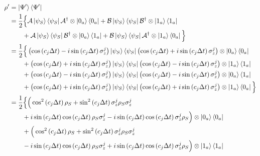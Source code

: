 \documentclass[a4paper,12pt]{article}
\begin{document}
	\begin{align*}
		\rho' &= \ket{\Psi'}\bra{\Psi'} \\ 
		& = \frac{1}{2} \Big\{ \mathcal{A} \ket{\psi_S}\bra{\psi_S} \mathcal{A^{\dagger}} \otimes \ket{0_a}\bra{0_a} + \mathcal{B} \ket{\psi_S}\bra{\psi_S} \mathcal{B^{\dagger}} \otimes \ket{1_a}\bra{1_a} \\
		& \qquad + \mathcal{A} \ket{\psi_S}\bra{\psi_S} \mathcal{B^{\dagger}} \otimes \ket{0_a}\bra{1_a} +  \mathcal{B} \ket{\psi_S}\bra{\psi_S} \mathcal{A^{\dagger}} \otimes \ket{1_a}\bra{0_a} \Big\} \\
		& = \frac{1}{2} \Big\{ \left(\cos{\left( c_j \Delta t \right)} - i \sin{\left( c_j \Delta t \right) \sigma_{z}^{j}}\right)  \ket{\psi_S}\bra{\psi_S} \left( \cos{\left( c_j \Delta t \right)} + i \sin{\left( c_j \Delta t \right) \sigma_{z}^{j}}\right) \otimes \ket{0_a}\bra{0_a} \\
		& \qquad + \left(\cos{\left( c_j \Delta t \right)} + i \sin{\left( c_j \Delta t \right) \sigma_{z}^{j}}\right)  \ket{\psi_S}\bra{\psi_S} \left( \cos{\left( c_j \Delta t \right)} - i \sin{\left( c_j \Delta t \right) \sigma_{z}^{j}}\right) \otimes \ket{1_a}\bra{1_a} \\
		& \qquad + \left(\cos{\left( c_j \Delta t \right)} - i \sin{\left( c_j \Delta t \right) \sigma_{z}^{j}}\right)  \ket{\psi_S}\bra{\psi_S} \left( \cos{\left( c_j \Delta t \right)} - i \sin{\left( c_j \Delta t \right) \sigma_{z}^{j}}\right) \otimes \ket{0_a}\bra{1_a} \\
		& \qquad + \left(\cos{\left( c_j \Delta t \right)} + i \sin{\left( c_j \Delta t \right) \sigma_{z}^{j}}\right)  \ket{\psi_S}\bra{\psi_S} \left( \cos{\left( c_j \Delta t \right)} + i \sin{\left( c_j \Delta t \right) \sigma_{z}^{j}}\right) \otimes \ket{1_a}\bra{0_a} \Big\} \\
		& = \frac{1}{2} \Big\{ \Big( \cos^{2}{\left( c_j \Delta t \right)} \, \rho_S + \sin^{2}{\left( c_j \Delta t \right)} \, \sigma_{z}^{j}\rho_S\sigma_{z}^{j} \\
		& \qquad +i \sin{\left( c_j \Delta t \right)}\cos{\left( c_j \Delta t \right)} \, \rho_S \sigma_{z}^{j} - i \sin{\left( c_j \Delta t \right)}\cos{\left( c_j \Delta t \right)} \, \sigma_{z}^{j} \rho_S \Big) \otimes \ket{0_a}\bra{0_a} \\
		& \qquad  + \Big( \cos^{2}{\left( c_j \Delta t \right)} \, \rho_S + \sin^{2}{\left( c_j \Delta t \right)} \, \sigma_{z}^{j}\rho_S\sigma_{z}^{j} \\
		& \qquad - i \sin{\left( c_j \Delta t \right)}\cos{\left( c_j \Delta t \right)} \, \rho_S \sigma_{z}^{j} + i \sin{\left( c_j \Delta t \right)}\cos{\left( c_j \Delta t \right)} \, \sigma_{z}^{j} \rho_S \Big) \otimes \ket{1_a}\bra{1_a} \\

\end{align*}
\end{document}
